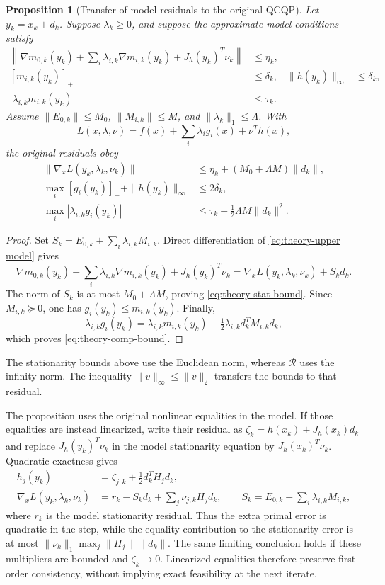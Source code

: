 \documentclass[pdflatex,sn-mathphys-num]{sn-jnl}
\theoremstyle{thmstyleone}
\newtheorem{proposition}[theorem]{Proposition}
\theoremstyle{thmstylethree}
\begin{document}
\begin{proposition}[Transfer of model residuals to the original QCQP]
\label{prop:theory-residual transfer}
Let $y_k=x_k+d_k$. Suppose $\lambda_k\geq0$, and suppose the approximate
model conditions satisfy
\begin{align*}
 \left\|\nabla m_{0,k}(y_k)+
       \sum_i\lambda_{i,k}\nabla m_{i,k}(y_k)+J_h(y_k)^T\nu_k\right\|
       &\leq\eta_k,\\
 [m_{i,k}(y_k)]_+&\leq\delta_k,
 &\|h(y_k)\|_\infty&\leq\delta_k,\\
 |\lambda_{i,k}m_{i,k}(y_k)|&\leq\tau_k.
\end{align*}
Assume $\|E_{0,k}\|\leq M_0$, $\|M_{i,k}\|\leq M$,
and $\|\lambda_k\|_1\leq\Lambda$. With
\[
 L(x,\lambda,\nu)=f(x)+\sum_i\lambda_i g_i(x)+\nu^Th(x),
\]
the original residuals obey
\begin{align}
 \|\nabla_x L(y_k,\lambda_k,\nu_k)\|
   &\leq \eta_k+(M_0+\Lambda M)\|d_k\|,\label{eq:theory-stat-bound}\\
 \max_i[g_i(y_k)]_+ +\|h(y_k)\|_\infty
   &\leq2\delta_k,\\
 \max_i|\lambda_{i,k}g_i(y_k)|
   &\leq\tau_k+\tfrac12\Lambda M\|d_k\|^2.
 \label{eq:theory-comp-bound}
\end{align}
\end{proposition}
\begin{proof}
Set $S_k=E_{0,k}+\sum_i\lambda_{i,k}M_{i,k}$. Direct differentiation of
\eqref{eq:theory-upper model} gives
\[
 \nabla m_{0,k}(y_k)+\sum_i\lambda_{i,k}\nabla m_{i,k}(y_k)
       +J_h(y_k)^T\nu_k
 =\nabla_xL(y_k,\lambda_k,\nu_k)+S_kd_k.
\]
The norm of $S_k$ is at most $M_0+\Lambda M$, proving
\eqref{eq:theory-stat-bound}. Since $M_{i,k}\succeq0$, one has
$g_i(y_k)\leq m_{i,k}(y_k)$. Finally,
\[
 \lambda_{i,k}g_i(y_k)
 =\lambda_{i,k}m_{i,k}(y_k)
   -\tfrac12\lambda_{i,k}d_k^TM_{i,k}d_k,
\]
which proves \eqref{eq:theory-comp-bound}.
\end{proof}

The stationarity bounds above use the Euclidean norm, whereas
$\mathcal R$ uses the infinity norm. The inequality
$\|v\|_\infty\leq\|v\|_2$ transfers the bounds to that residual.

The proposition uses the original nonlinear equalities in the model.
If those equalities are instead linearized, write their residual as
$\zeta_k=h(x_k)+J_h(x_k)d_k$ and replace $J_h(y_k)^T\nu_k$ in the
model stationarity equation by $J_h(x_k)^T\nu_k$. Quadratic exactness gives
\begin{align}
 h_j(y_k)&=\zeta_{j,k}+\tfrac12d_k^TH_jd_k,\label{eq:linearized-equality-defect}\\
 \nabla_xL(y_k,\lambda_k,\nu_k)
 &=r_k-S_kd_k+\sum_j\nu_{j,k}H_jd_k,
 \qquad S_k=E_{0,k}+\sum_i\lambda_{i,k}M_{i,k},
 \label{eq:linearized-equality-stationarity}
\end{align}
where $r_k$ is the model stationarity residual. Thus the extra primal
error is quadratic in the step, while the equality contribution to the
stationarity error is at most
$\|\nu_k\|_1\max_j\|H_j\|\,\|d_k\|$. The same limiting conclusion
holds if these multipliers are bounded and $\zeta_k\to0$. Linearized
equalities therefore preserve first order consistency, without implying
exact feasibility at the next iterate.
\end{document}
